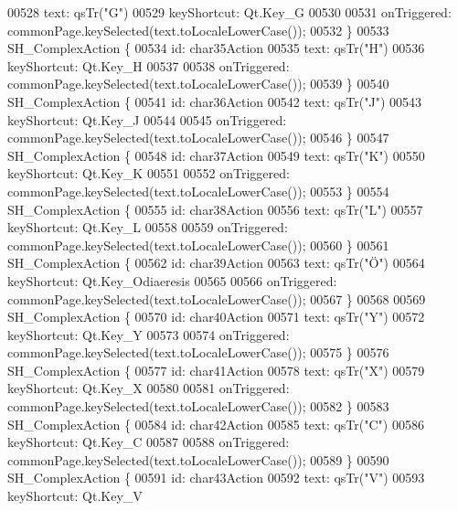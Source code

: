 \begin{DoxyCode}
00528         text: qsTr(\textcolor{stringliteral}{"G"})
00529         keyShortcut: Qt.Key\_G
00530 
00531         onTriggered: commonPage.keySelected(text.toLocaleLowerCase());
00532     \}
00533     SH\_ComplexAction \{
00534         \textcolor{keywordtype}{id}: char35Action
00535         text: qsTr(\textcolor{stringliteral}{"H"})
00536         keyShortcut: Qt.Key\_H
00537 
00538         onTriggered: commonPage.keySelected(text.toLocaleLowerCase());
00539     \}
00540     SH\_ComplexAction \{
00541         \textcolor{keywordtype}{id}: char36Action
00542         text: qsTr(\textcolor{stringliteral}{"J"})
00543         keyShortcut: Qt.Key\_J
00544 
00545         onTriggered: commonPage.keySelected(text.toLocaleLowerCase());
00546     \}
00547     SH\_ComplexAction \{
00548         \textcolor{keywordtype}{id}: char37Action
00549         text: qsTr(\textcolor{stringliteral}{"K"})
00550         keyShortcut: Qt.Key\_K
00551 
00552         onTriggered: commonPage.keySelected(text.toLocaleLowerCase());
00553     \}
00554     SH\_ComplexAction \{
00555         \textcolor{keywordtype}{id}: char38Action
00556         text: qsTr(\textcolor{stringliteral}{"L"})
00557         keyShortcut: Qt.Key\_L
00558 
00559         onTriggered: commonPage.keySelected(text.toLocaleLowerCase());
00560     \}
00561     SH\_ComplexAction \{
00562         \textcolor{keywordtype}{id}: char39Action
00563         text: qsTr(\textcolor{stringliteral}{"Ö"})
00564         keyShortcut: Qt.Key\_Odiaeresis
00565 
00566         onTriggered: commonPage.keySelected(text.toLocaleLowerCase());
00567     \}
00568 
00569     SH\_ComplexAction \{
00570         \textcolor{keywordtype}{id}: char40Action
00571         text: qsTr(\textcolor{stringliteral}{"Y"})
00572         keyShortcut: Qt.Key\_Y
00573 
00574         onTriggered: commonPage.keySelected(text.toLocaleLowerCase());
00575     \}
00576     SH\_ComplexAction \{
00577         \textcolor{keywordtype}{id}: char41Action
00578         text: qsTr(\textcolor{stringliteral}{"X"})
00579         keyShortcut: Qt.Key\_X
00580 
00581         onTriggered: commonPage.keySelected(text.toLocaleLowerCase());
00582     \}
00583     SH\_ComplexAction \{
00584         \textcolor{keywordtype}{id}: char42Action
00585         text: qsTr(\textcolor{stringliteral}{"C"})
00586         keyShortcut: Qt.Key\_C
00587 
00588         onTriggered: commonPage.keySelected(text.toLocaleLowerCase());
00589     \}
00590     SH\_ComplexAction \{
00591         \textcolor{keywordtype}{id}: char43Action
00592         text: qsTr(\textcolor{stringliteral}{"V"})
00593         keyShortcut: Qt.Key\_V

\end{DoxyCode}

